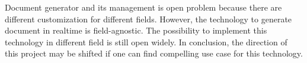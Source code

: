 \documentclass{scrreprt}
\begin{document}
Document generator and its management is open problem because there are different customization for different fields. However, the technology to generate document in realtime is field-agnostic. The possibility to implement this technology in different field is still open widely. In conclusion, the direction of this project may be shifted if one can find compelling use case for this technology. 
\end{document}
